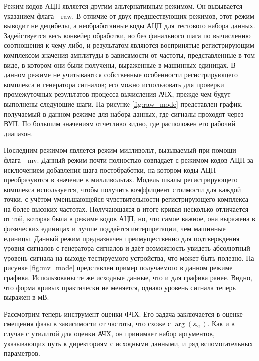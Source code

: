 \documentclass{report}
\begin{document}

Режим кодов АЦП является другим альтернативным режимом. Он вызывается указанием флага -{}-raw. В отличие от двух предшествующих режимов, этот режим выводит не децибелы, а необработанные коды АЦП для тестового набора данных. Задействуется весь конвейер обработки, но без финального шага по вычислению соотношения к чему-либо, и результатом являются воспринятые регистрирующим комплексом значения амплитуды в зависимости от частоты, представленные в том виде, в котором они были получены, выраженные в машинных единицах. В данном режиме не учитываются собственные особенности регистрирующего комплекса и генератора сигналов; его можно использовать для проверки промежуточных результатов процесса вычисления АЧХ, прежде чем будут выполнены следующие шаги. На рисунке \ref{fig:raw_mode} представлен график, получаемый в данном режиме для набора данных, где сигналы проходят через ВУП. По большим значениям отчетливо видно, где расположен его рабочий диапазон.


Последним режимом является режим милливольт, вызываемый при помощи флага -{}-mv. Данный режим почти полностью совпадает с режимом кодов АЦП за исключением добавления шага постобработки, на котором коды АЦП преобразуются в значение в милливольтах. Модель шкалы регистрирующего комплекса используется, чтобы получить коэффициент стоимости для каждой точки, с учётом уменьшающейся чувствительности регистрирующего комплекса на более высоких частотах. Получающаяся в итоге кривая несколько отличается от той, которая была в режиме кодов АЦП, но, что самое важное, она выражена в физических единицах и лучше поддаётся интерпретации, чем машинные единицы. Данный режим предназначен преимущественно для подтверждения уровня сигналов с генератора сигналов и даёт возможность увидеть абсолютный уровень сигнала на выходе тестируемого устройства, что может быть полезно. На рисунке \ref{fig:mv_mode} представлен пример получаемого в данном режиме графика. Использованы те же исходные данные, что и для графика ранее. Видно, что форма кривых практически не меняется, однако уровень сигнала теперь выражен в мВ.


Рассмотрим теперь инструмент оценки ФЧХ. Его задача заключается в оценке смещения фазы в зависимости от частоты, что схоже с $\arg(s_{21})$. Как и в случае с утилитой для оценки АЧХ, он принимает набор аргументов, указывающих путь к директориям с исходными данными, и ряд вспомогательных параметров.
\end{document}
